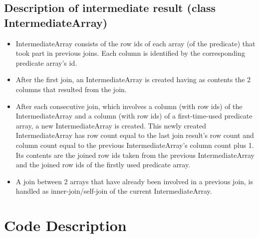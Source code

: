 \documentclass{ws-ijprai}
\begin{document}
\subsection{Description of intermediate result (class IntermediateArray)}
\begin{itemize}
    \item IntermediateArray consists of the row ids of each array (of the predicate) that took part in previous joins. Each column is identified by the corresponding predicate array’s id.
    \item After the first join, an IntermediateArray is created having as contents the 2 columns that resulted from the join.
    \item After each consecutive join, which involves a column (with row ids) of the IntermediateArray and a column (with row ids) of a first-time-used predicate array, a new IntermediateArray is created. This newly created IntermediateArray has row count equal to the last join result’s row count and column count equal to the previous IntermediateArray’s column count plus 1. Its contents are the joined row ids taken from the previous IntermediateArray and the joined row ids of the firstly used predicate array.
    \item A join between 2 arrays that have already been involved in a previous join, is handled as inner-join/self-join of the current IntermediateArray.

\end{itemize}

\section{Code Description}
\end{document}
